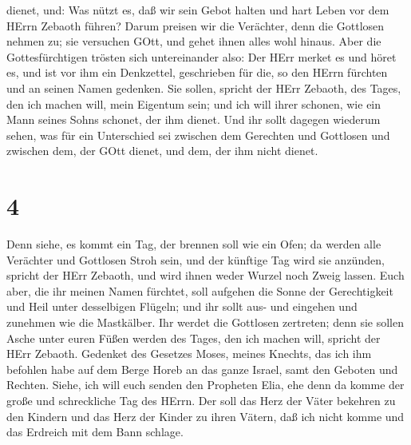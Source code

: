 dienet, und: Was nützt es, daß wir sein Gebot halten und hart Leben vor
dem HErrn Zebaoth führen?  Darum preisen wir die Verächter,
denn die Gottlosen nehmen zu; sie versuchen GOtt, und gehet ihnen alles
wohl hinaus.  Aber die Gottesfürchtigen trösten sich
untereinander also: Der HErr merket es und höret es, und ist vor ihm ein
Denkzettel, geschrieben für die, so den HErrn fürchten und an seinen
Namen gedenken.  Sie sollen, spricht der HErr Zebaoth, des
Tages, den ich machen will, mein Eigentum sein; und ich will ihrer
schonen, wie ein Mann seines Sohns schonet, der ihm dienet.
 Und ihr sollt dagegen wiederum sehen, was für ein
Unterschied sei zwischen dem Gerechten und Gottlosen und zwischen dem,
der GOtt dienet, und dem, der ihm nicht dienet.

\hypertarget{section-3}{%
\section{4}\label{section-3}}

 Denn siehe, es kommt ein Tag, der brennen soll wie ein
Ofen; da werden alle Verächter und Gottlosen Stroh sein, und der
künftige Tag wird sie anzünden, spricht der HErr Zebaoth, und wird ihnen
weder Wurzel noch Zweig lassen.  Euch aber, die ihr meinen
Namen fürchtet, soll aufgehen die Sonne der Gerechtigkeit und Heil unter
desselbigen Flügeln; und ihr sollt aus- und eingehen und zunehmen wie
die Mastkälber.  Ihr werdet die Gottlosen zertreten; denn
sie sollen Asche unter euren Füßen werden des Tages, den ich machen
will, spricht der HErr Zebaoth.  Gedenket des Gesetzes
Moses, meines Knechts, das ich ihm befohlen habe auf dem Berge Horeb an
das ganze Israel, samt den Geboten und Rechten.  Siehe, ich
will euch senden den Propheten Elia, ehe denn da komme der große und
schreckliche Tag des HErrn.  Der soll das Herz der Väter
bekehren zu den Kindern und das Herz der Kinder zu ihren Vätern, daß ich
nicht komme und das Erdreich mit dem Bann schlage.
